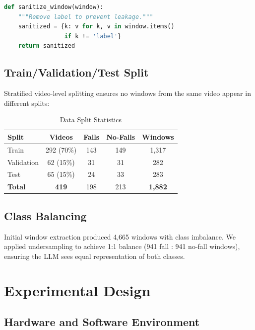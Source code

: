 \documentclass[conference]{IEEEtran}
\begin{document}
\begin{lstlisting}[language=Python]
def sanitize_window(window):
    """Remove label to prevent leakage."""
    sanitized = {k: v for k, v in window.items() 
                 if k != 'label'}
    return sanitized
\end{lstlisting}

\subsection{Train/Validation/Test Split}

Stratified video-level splitting ensures no windows from the same video appear in different splits:

\begin{table}[!t]
\centering
\caption{Data Split Statistics}
\label{tab:splits}
\begin{tabular}{lcccc}
\toprule
\textbf{Split} & \textbf{Videos} & \textbf{Falls} & \textbf{No-Falls} & \textbf{Windows} \\
\midrule
Train & 292 (70\%) & 143 & 149 & 1,317 \\
Validation & 62 (15\%) & 31 & 31 & 282 \\
Test & 65 (15\%) & 24 & 33 & 283 \\
\midrule
\textbf{Total} & \textbf{419} & 198 & 213 & \textbf{1,882} \\
\bottomrule
\end{tabular}
\end{table}

\subsection{Class Balancing}

Initial window extraction produced 4,665 windows with class imbalance. We applied undersampling to achieve 1:1 balance (941 fall : 941 no-fall windows), ensuring the LLM sees equal representation of both classes.

\section{Experimental Design}

\subsection{Hardware and Software Environment}
\end{document}
